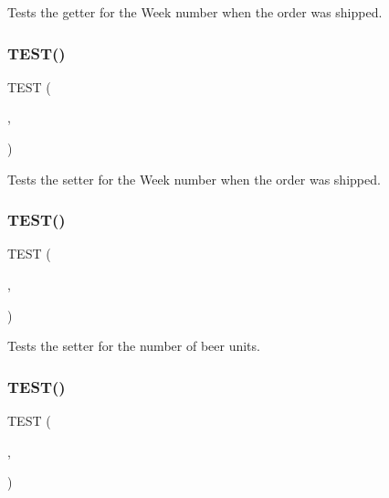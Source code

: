 Tests the getter for the Week number when the order was shipped. \mbox{\label{group__group2_ga3a123025e9d4927197994e1ee8cc2cec}} 
\subsubsection{\texorpdfstring{T\+E\+S\+T()}{TEST()}\hspace{0.1cm}{\footnotesize\ttfamily [49/54]}}
{\footnotesize\ttfamily T\+E\+ST (\begin{DoxyParamCaption}\item[{order\+Test}]{,  }\item[{set\+Shipped\+In\+Week\+Test}]{ }\end{DoxyParamCaption})}

Tests the setter for the Week number when the order was shipped. \mbox{\label{group__group2_ga42cb3c35c8e002551bde5a8786aaa5ea}} 
\subsubsection{\texorpdfstring{T\+E\+S\+T()}{TEST()}\hspace{0.1cm}{\footnotesize\ttfamily [50/54]}}
{\footnotesize\ttfamily T\+E\+ST (\begin{DoxyParamCaption}\item[{order\+Test}]{,  }\item[{set\+Number\+Of\+Beers\+Test}]{ }\end{DoxyParamCaption})}

Tests the setter for the number of beer units. \mbox{\label{group__group2_ga5a13e663e9cd26f34be5170a22834f92}} 
\subsubsection{\texorpdfstring{T\+E\+S\+T()}{TEST()}\hspace{0.1cm}{\footnotesize\ttfamily [51/54]}}
{\footnotesize\ttfamily T\+E\+ST (\begin{DoxyParamCaption}\item[{order\+Test}]{,  }\item[{get\+Number\+Of\+Beers\+Test}]{ }\end{DoxyParamCaption})}

